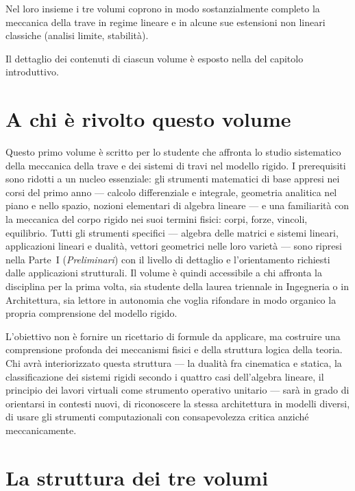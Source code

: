 Nel loro insieme i tre volumi coprono in modo
sostanzialmente completo la meccanica della trave in regime
lineare e in alcune sue estensioni non lineari classiche
(analisi limite, stabilità).

Il dettaglio dei contenuti di ciascun volume è esposto nella
 del capitolo introduttivo.

\section*{A chi è rivolto questo volume}

Questo primo volume è scritto per lo studente che affronta lo
studio sistematico della meccanica della trave e dei sistemi
di travi nel modello rigido. I prerequisiti sono ridotti a un
nucleo essenziale: gli strumenti matematici di base appresi
nei corsi del primo anno --- calcolo differenziale e
integrale, geometria analitica nel piano e nello spazio,
nozioni elementari di algebra lineare --- e una familiarità
con la meccanica del corpo rigido nei suoi termini fisici:
corpi, forze, vincoli, equilibrio. Tutti gli strumenti
specifici --- algebra delle matrici e sistemi lineari,
applicazioni lineari e dualità, vettori geometrici nelle loro
varietà --- sono ripresi nella Parte~I (\textit{Preliminari})
con il livello di dettaglio e l'orientamento richiesti dalle
applicazioni strutturali. Il volume è quindi accessibile a
chi affronta la disciplina per la prima volta, sia studente
della laurea triennale in Ingegneria o in Architettura, sia
lettore in autonomia che voglia rifondare in modo organico la
propria comprensione del modello rigido.

L'obiettivo non è fornire un ricettario di formule da
applicare, ma costruire una comprensione profonda dei
meccanismi fisici e della struttura logica della teoria. Chi
avrà interiorizzato questa struttura --- la dualità fra
cinematica e statica, la classificazione dei sistemi rigidi
secondo i quattro casi dell'algebra lineare, il principio dei
lavori virtuali come strumento operativo unitario --- sarà in
grado di orientarsi in contesti nuovi, di riconoscere la
stessa architettura in modelli diversi, di usare gli
strumenti computazionali con consapevolezza critica anziché
meccanicamente.

\section*{La struttura dei tre volumi}

